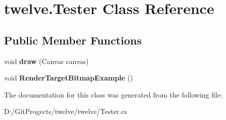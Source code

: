 \hypertarget{classtwelve_1_1_tester}{}\section{twelve.\+Tester Class Reference}
\label{classtwelve_1_1_tester}
\subsection*{Public Member Functions}
\begin{DoxyCompactItemize}
\item 
\hypertarget{classtwelve_1_1_tester_adb766d6122378b679b3d5a9dcf882789}{}void {\bfseries draw} (Canvas canvas)\label{classtwelve_1_1_tester_adb766d6122378b679b3d5a9dcf882789}

\item 
\hypertarget{classtwelve_1_1_tester_aca4ac437d1e133e5d1bbff31860ae0a5}{}void {\bfseries Render\+Target\+Bitmap\+Example} ()\label{classtwelve_1_1_tester_aca4ac437d1e133e5d1bbff31860ae0a5}

\end{DoxyCompactItemize}


The documentation for this class was generated from the following file\+:\begin{DoxyCompactItemize}
\item 
D\+:/\+Git\+Progects/twelve/twelve/Tester.\+cs\end{DoxyCompactItemize}
